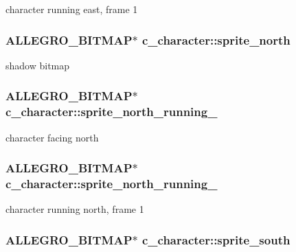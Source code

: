 character running east, frame 1 \hypertarget{classc__character_a97b679f81ebff4c53933a278a05a11c6}{
\subsubsection[{sprite\-\_\-north}]{\setlength{\rightskip}{0pt plus 5cm}A\-L\-L\-E\-G\-R\-O\-\_\-\-B\-I\-T\-M\-A\-P$\ast$ c\-\_\-character\-::sprite\-\_\-north\hspace{0.3cm}{\ttfamily [protected]}}}\label{classc__character_a97b679f81ebff4c53933a278a05a11c6}
shadow bitmap \hypertarget{classc__character_adb3cfdb7715791d21a0ac917b4443b47}{
\subsubsection[{sprite\-\_\-north\-\_\-running\-\_\-1}]{\setlength{\rightskip}{0pt plus 5cm}A\-L\-L\-E\-G\-R\-O\-\_\-\-B\-I\-T\-M\-A\-P$\ast$ c\-\_\-character\-::sprite\-\_\-north\-\_\-running\-\_\hspace{0.3cm}{\ttfamily [protected]}}}\label{classc__character_adb3cfdb7715791d21a0ac917b4443b47}
character facing north \hypertarget{classc__character_a009fa720b3902c4517edea6e1195daf5}{
\subsubsection[{sprite\-\_\-north\-\_\-running\-\_\-2}]{\setlength{\rightskip}{0pt plus 5cm}A\-L\-L\-E\-G\-R\-O\-\_\-\-B\-I\-T\-M\-A\-P$\ast$ c\-\_\-character\-::sprite\-\_\-north\-\_\-running\-\_\hspace{0.3cm}{\ttfamily [protected]}}}\label{classc__character_a009fa720b3902c4517edea6e1195daf5}
character running north, frame 1 \hypertarget{classc__character_a3ca4db7645eb80c31738f5c5dae337a9}{
\subsubsection[{sprite\-\_\-south}]{\setlength{\rightskip}{0pt plus 5cm}A\-L\-L\-E\-G\-R\-O\-\_\-\-B\-I\-T\-M\-A\-P$\ast$ c\-\_\-character\-::sprite\-\_\-south\hspace{0.3cm}{\ttfamily [protected]}}}\label{classc__character_a3ca4db7645eb80c31738f5c5dae337a9}
